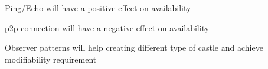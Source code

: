 
\begin{description}[style=nextline]
  \item[S1\label{s1}] Ping/Echo will have a positive effect on availability
  \item[S2\label{s2}] \gls{p2p} connection will have a negative effect on availability
  \item[S3\label{s3}] Observer patterns will help creating different type of castle and achieve modifiability requirement
\end{description}
